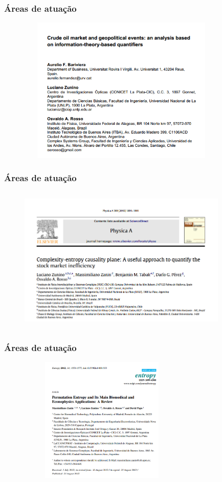 \documentclass[10pt, compress]{beamer}
\begin{document}
\begin{frame}[fragile]
\frametitle{Áreas de atuação}
\begin{figure}
  \centering
   \includegraphics[width=10cm,height=7cm]{CrudeOil.png}
\end{figure}
\end{frame}

\begin{frame}[fragile]
\frametitle{Áreas de atuação}
\begin{figure}
  \centering
   \includegraphics[width=10cm,height=7cm]{StockMarket.png}
\end{figure}
\end{frame}

\begin{frame}[fragile]
\frametitle{Áreas de atuação}

\begin{figure}
  \centering
   \includegraphics[width=8cm,height=6cm]{Biomedical.png}
\end{figure}
\end{frame}
\end{document}
